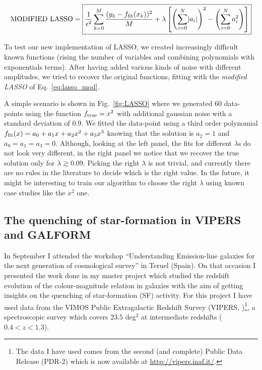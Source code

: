 \documentclass[11pt]{article}
\begin{document}
\begin{equation}
\label{eq:lasso_mod}
\text{MODIFIED LASSO} = \boxed{\frac{1}{\epsilon^2}  \sum_{k=0}^M\frac{(y_k - f_{\rm{fit}}(x_k))^2}{M} + \lambda \left[ \left( \sum_{i=0}^N \lvert a_i \rvert \right)^2 - \left(\sum_{i=0}^N a_i^2\right)\right]}
\end{equation}

 To test our new implementation of LASSO, we created increasingly difficult known functions (rising the number of variables and combining polynomials with exponentials terms). After having added various kinds of noise with different amplitudes, we tried to recover the original functions, fitting with the \emph{modified LASSO} of Eq.~\ref{eq:lasso_mod}. 
 
 A simple scenario is shown in Fig.~\ref{fig:LASSO} where we generated 60 data-points using the function $f_{\rm{true}} = x^2$ with additional gaussian noise with a standard deviation of 0.9. We fitted the data-point using a third order polynomial $f_{\rm{fit}}(x)=a_0 + a_1x  + a_2x^2 + a_3 x^3$ knowing that the solution is $a_2=1$ and $a_0=a_1=a_3=0$. Although, looking at the left panel, the fits for different $\lambda$s do not look very different, in the right panel we notice that we recover the true solution only for $\lambda \gtrsim 0.09$. Picking the right $\lambda$ is not trivial, and currently there are no rules in the literature to decide which is the right value. In the future, it might be interesting to train our algorithm to choose the right $\lambda$ using known case studies like the $x^2$ one.


\subsection{The quenching of star-formation in VIPERS and GALFORM}
\label{sub:vipers}

In September I attended the workshop ``Understanding Emission-line galaxies for the next generation of cosmological survey'' in Teruel (Spain). 
On that occasion I presented the work done in my master project which studied the redshift evolution of the colour-magnitude relation in galaxies with the aim of getting insights on the quenching of star-formation (SF) activity. For this project I have used data from the VIMOS Public Extragalactic Redshift Survey (VIPERS, \citealt{guzzo14,scodeggio16})\footnote{The data I have used comes from the second (and complete) Public Data Release (PDR-2) which is now available at \url{http://vipers.inaf.it/}. }, a spectroscopic survey which covers $23.5$ deg$^2$ at intermediate redshifts ($0.4<z<1.3$).
\end{document}
